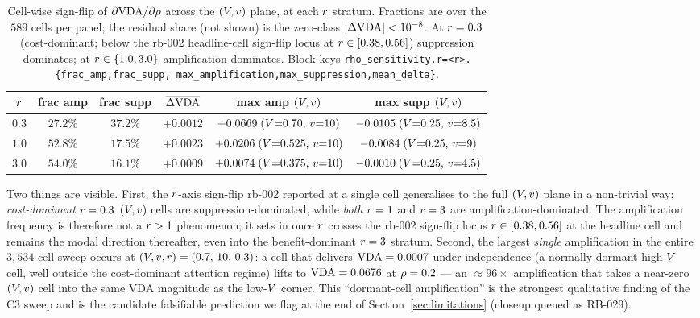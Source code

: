 \begin{table}[t]
  \centering
  \small
  \begin{tabular}{c c c c c c}
    \toprule
    $r$ & frac amp & frac supp &
    $\overline{\Delta\mathrm{VDA}}$ & max amp $(V, v)$ & max supp $(V, v)$ \\
    \midrule
    $0.3$ & $27.2\%$ & $\mathbf{37.2\%}$ & $+0.0012$ &
      $+0.0669\;(V{=}0.70,\,v{=}10)$ &
      $-0.0105\;(V{=}0.25,\,v{=}8.5)$\\
    $1.0$ & $\mathbf{52.8\%}$ & $17.5\%$ & $+0.0023$ &
      $+0.0206\;(V{=}0.525,\,v{=}10)$ &
      $-0.0084\;(V{=}0.25,\,v{=}9)$\\
    $3.0$ & $\mathbf{54.0\%}$ & $16.1\%$ & $+0.0009$ &
      $+0.0074\;(V{=}0.375,\,v{=}10)$ &
      $-0.0010\;(V{=}0.25,\,v{=}4.5)$\\
    \bottomrule
  \end{tabular}
  \caption{Cell-wise sign-flip of $\partial \mathrm{VDA} / \partial \rho$
  across the $(V, v)$ plane, at each $r$ stratum.
  Fractions are over the $589$ cells per panel; the residual share
  (not shown) is the zero-class $|\Delta\mathrm{VDA}| < 10^{-8}$. At
  $r = 0.3$ (cost-dominant; below the rb-002 headline-cell
  sign-flip locus at $r \in [0.38, 0.56]$) suppression
  dominates; at $r \in \{1.0, 3.0\}$ amplification dominates.
  Block-keys \texttt{rho\_sensitivity.r=<r>.\{frac\_amp,frac\_supp,
  max\_amplification,max\_suppression,mean\_delta\}}.}
  \label{tab:c3-sign-flip}
\end{table}
%
Two things are visible. First, the $r$-axis sign-flip rb-002
reported at a single cell generalises to the full $(V, v)$
plane in a non-trivial way: \emph{cost-dominant} $r = 0.3$
$(V, v)$ cells are suppression-dominated, while \emph{both}
$r = 1$ and $r = 3$ are amplification-dominated. The
amplification frequency is therefore not a $r > 1$ phenomenon;
it sets in once $r$ crosses the rb-002 sign-flip locus
$r \in [0.38, 0.56]$ at the headline cell and remains the
modal direction thereafter, even into the benefit-dominant
$r = 3$ stratum. Second, the largest \emph{single} amplification
in the entire $3{,}534$-cell sweep occurs at $(V, v, r)
= (0.7,\, 10,\, 0.3)$: a cell that delivers $\mathrm{VDA} = 0.0007$ under
independence (a normally-dormant high-$V$ cell, well outside
the cost-dominant attention regime) lifts to $\mathrm{VDA} = 0.0676$ at
$\rho = 0.2$ --- an $\approx 96\times$ amplification that takes a
near-zero $(V, v)$ cell into the same VDA magnitude as the
low-$V$ corner. This ``dormant-cell amplification'' is the
strongest qualitative finding of the C3 sweep and is the candidate
falsifiable prediction we flag at the end of
Section~\ref{sec:limitations} (closeup queued as RB-029).

